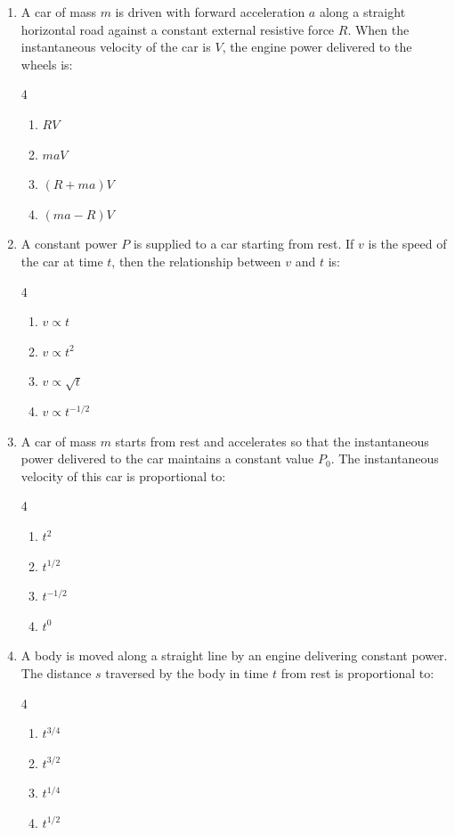 \documentclass[11pt,a4paper]{article}
\begin{document}
\begin{enumerate}[label=\textbf{\arabic*.},leftmargin=18pt,itemsep=8pt]
  \item A car of mass $m$ is driven with forward acceleration $a$ along a straight horizontal road against a constant external resistive force $R$. When the instantaneous velocity of the car is $V$, the engine power delivered to the wheels is:
  \begin{multicols}{4}
    \begin{enumerate}[label=(\Alph*)]
      \item $RV$
      \item $maV$
      \item $(R + ma)V$
      \item $(ma - R)V$
    \end{enumerate}
  \end{multicols}

  \item A constant power $P$ is supplied to a car starting from rest. If $v$ is the speed of the car at time $t$, then the relationship between $v$ and $t$ is:
  \begin{multicols}{4}
    \begin{enumerate}[label=(\Alph*)]
      \item $v \propto t$
      \item $v \propto t^2$
      \item $v \propto \sqrt{t}$
      \item $v \propto t^{-1/2}$
    \end{enumerate}
  \end{multicols}

  \item A car of mass $m$ starts from rest and accelerates so that the instantaneous power delivered to the car maintains a constant value $P_0$. The instantaneous velocity of this car is proportional to:
  \begin{multicols}{4}
    \begin{enumerate}[label=(\Alph*)]
      \item $t^2$
      \item $t^{1/2}$
      \item $t^{-1/2}$
      \item $t^0$
    \end{enumerate}
  \end{multicols}

  \item A body is moved along a straight line by an engine delivering constant power. The distance $s$ traversed by the body in time $t$ from rest is proportional to:
  \begin{multicols}{4}
    \begin{enumerate}[label=(\Alph*)]
      \item $t^{3/4}$
      \item $t^{3/2}$
      \item $t^{1/4}$
      \item $t^{1/2}$
    \end{enumerate}
  \end{multicols}


\end{enumerate}
\end{document}
